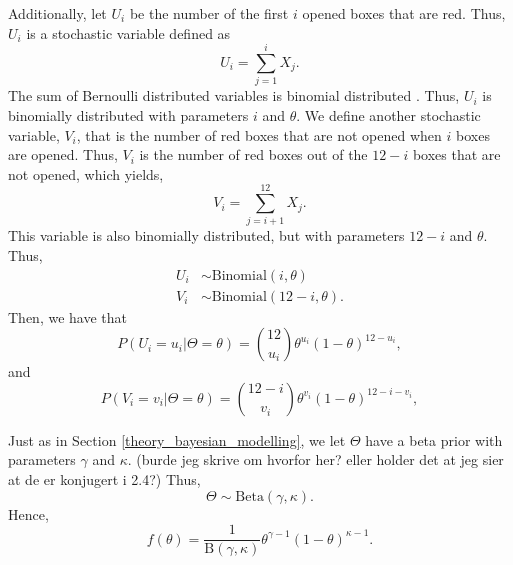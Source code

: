 Additionally, let $U_i$ be the number of the first $i$ opened boxes that are red. Thus, $U_i$ is a stochastic variable defined as
\begin{equation*}
    U_i = \sum_{j=1}^{i} X_j. 
\end{equation*}
The sum of Bernoulli distributed variables is binomial distributed \citep{statinf}. Thus, $U_i$ is binomially distributed with parameters $i$ and $\theta$. We define another stochastic variable, $V_i$, that is the number of red boxes that are not opened when $i$ boxes are opened. Thus, $V_i$ is the number of red boxes out of the $12-i$ boxes that are not opened, which yields,
\begin{equation*}
    V_i = \sum_{j=i+1}^{12} X_j.
\end{equation*}
This variable is also binomially distributed, but with parameters $12-i$ and $\theta$. Thus,
\begin{equation}
\label{U_V_binomal_distri}
    \begin{aligned}
        U_i &\sim \text{Binomial}(i,\theta)\\
        V_i &\sim \text{Binomial}(12-i,\theta).
    \end{aligned}
\end{equation}
Then, we have that 
\begin{equation}
\label{ui_prob_mass}
    P(U_i=u_i|\Theta=\theta) = \binom{12}{u_i} \theta^{u_i}(1-\theta)^{12-u_i},
\end{equation}
and
\begin{equation}
\label{vi_prob_mass}
    P(V_i=v_i|\Theta=\theta) = \binom{12-i}{v_i} \theta^{v_i}(1-\theta)^{12-i-v_i},
\end{equation}

Just as in Section \ref{theory_bayesian_modelling}, we let $\Theta$ have a beta prior with parameters $\gamma$ and $\kappa$. (burde jeg skrive om hvorfor her? eller holder det at jeg sier at de er konjugert i 2.4?)
Thus, 
\begin{equation}
\label{beta_prior_theta}
    \Theta \sim \text{Beta}(\gamma,\kappa).
\end{equation}
Hence,
\begin{equation}
\label{beta_density_func}
    f(\theta) = \frac{1}{\text{B}(\gamma,\kappa)}\theta^{\gamma-1}(1-\theta)^{\kappa-1}.
\end{equation}

